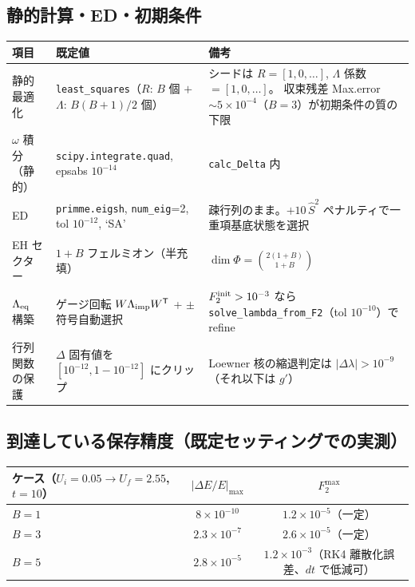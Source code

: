 \documentclass[11pt]{ltjsarticle}
\newcommand{\code}[1]{\texttt{#1}}
\begin{document}
\subsection*{静的計算・ED・初期条件}
\begin{center}
\begin{tabular}{llp{}}
\toprule
項目 & 既定値 & 備考 \\
\midrule
静的最適化 & \code{least\_squares}（$R$: $B$ 個 $+$ $\Lambda$: $B(B{+}1)/2$ 個） &
シードは $R=[1,0,\dots]$, $\Lambda$ 係数 $=[1,0,\dots]$。
収束残差 Max.error $\sim5\times10^{-4}$（$B{=}3$）が初期条件の質の下限 \\
$\omega$ 積分（静的） & \code{scipy.integrate.quad}, epsabs $10^{-14}$ & \code{calc\_Delta} 内 \\
ED & \code{primme.eigsh}, \code{num\_eig}=2, tol $10^{-12}$, `SA' & 疎行列のまま。$+10\,\hat S^2$
ペナルティで一重項基底状態を選択 \\
EH セクター & $1{+}B$ フェルミオン（半充填） & $\dim\Phi=\binom{2(1{+}B)}{1{+}B}$ \\
$\Lambda_{\rm eq}$ 構築 & ゲージ回転 $W\Lambda_{\rm imp}W^{\mathsf T}$ + $\pm$ 符号自動選択 &
$F_2^{\rm init}>10^{-3}$ なら \code{solve\_lambda\_from\_F2}（tol $10^{-10}$）で refine \\
行列関数の保護 & $\Delta$ 固有値を $[10^{-12}, 1{-}10^{-12}]$ にクリップ &
Loewner 核の縮退判定は $|\Delta\lambda|>10^{-9}$（それ以下は $g'$） \\
\bottomrule
\end{tabular}
\end{center}

\subsection*{到達している保存精度（既定セッティングでの実測）}
\begin{center}
\begin{tabular}{lcc}
\toprule
ケース（$U_i{=}0.05\to U_f{=}2.55$, $t{=}10$） & $|\Delta E/E|_{\max}$ & $F_2^{\max}$ \\
\midrule
$B=1$ & $8\times10^{-10}$ & $1.2\times10^{-5}$（一定） \\
$B=3$ & $2.3\times10^{-7}$ & $2.6\times10^{-5}$（一定） \\
$B=5$ & $2.8\times10^{-5}$ & $1.2\times10^{-3}$（RK4 離散化誤差、$dt$ で低減可） \\
\bottomrule
\end{tabular}
\end{center}
\end{document}
